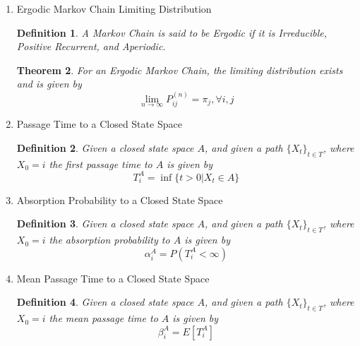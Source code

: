 \documentclass{article}
\newtheorem{definition}{Definition}[section]
\newtheorem{theorem}{Theorem}[section]
\begin{document}
\begin{enumerate}
\begin{theorem}
          In this case, the stationary distribution is given by
          \begin{equation}
            \pi_{i} = \frac{1}{\mu_{i}}
          \end{equation}
        \end{theorem}
  \item Ergodic Markov Chain Limiting Distribution
        \begin{definition}
          A Markov Chain is said to be Ergodic if
          it is Irreducible, Positive Recurrent, and Aperiodic.
        \end{definition}
        \begin{theorem}
          For an Ergodic Markov Chain, the limiting distribution exists and is given by
          \begin{equation}
            \lim_{n \to \infty} P^{(n)}_{ij} = \pi_{j}, \forall i, j
          \end{equation}
        \end{theorem}
  \item Passage Time to a Closed State Space
        \begin{definition}
          Given a closed state space $A$,
          and given a path $\{X_t\}_{t \in T}$,
          where $X_{0} = i$
          the first passage time to $A$ is given by
          \begin{equation}
            T^{A}_{i} = \inf\{t > 0 | X_{t} \in A\}
          \end{equation}
        \end{definition}
  \item Absorption Probability to a Closed State Space
        \begin{definition}
          Given a closed state space $A$,
          and given a path $\{X_t\}_{t \in T}$,
          where $X_{0} = i$
          the absorption probability to $A$ is given by
          \begin{equation}
            \alpha^{A}_{i} = P(T^{A}_{i} < \infty)
          \end{equation}
        \end{definition}
  \item Mean Passage Time to a Closed State Space
        \begin{definition}
          Given a closed state space $A$,
          and given a path $\{X_t\}_{t \in T}$,
          where $X_{0} = i$
          the mean passage time to $A$ is given by
          \begin{equation}
            \beta^{A}_{i} = E[T^{A}_{i}]
          \end{equation}
        \end{definition}
\end{enumerate}
\end{document}
